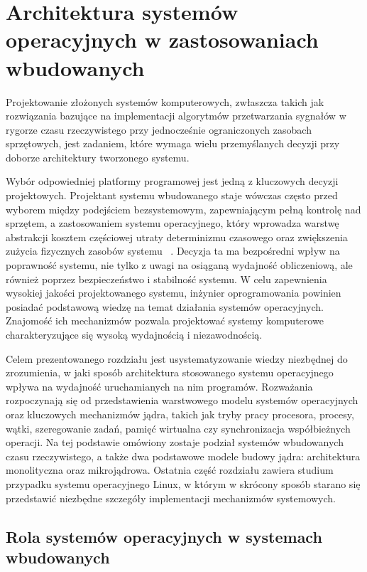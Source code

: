 \chapter{Architektura systemów operacyjnych w zastosowaniach wbudowanych}\label{}
Projektowanie złożonych systemów komputerowych, zwłaszcza takich jak rozwiązania bazujące na implementacji algorytmów przetwarzania sygnałów w rygorze czasu rzeczywistego przy jednocześnie ograniczonych zasobach sprzętowych, jest zadaniem, które wymaga wielu przemyślanych decyzji przy doborze architektury tworzonego systemu.

Wybór odpowiedniej platformy programowej jest jedną z kluczowych decyzji projektowych. Projektant systemu wbudowanego staje wówczas często przed wyborem między podejściem bezsystemowym, zapewniającym pełną kontrolę nad sprzętem, a zastosowaniem systemu operacyjnego, który wprowadza warstwę abstrakcji kosztem częściowej utraty determinizmu czasowego oraz zwiększenia zużycia fizycznych zasobów systemu ~\cite{Tanenbaum}. Decyzja ta ma bezpośredni wpływ na poprawność systemu, nie tylko z uwagi na osiąganą wydajność obliczeniową, ale również poprzez bezpieczeństwo i stabilność systemu.
W celu zapewnienia wysokiej jakości projektowanego systemu, inżynier oprogramowania powinien posiadać podstawową wiedzę na temat działania systemów operacyjnych. Znajomość ich mechanizmów pozwala projektować systemy komputerowe charakteryzujące się wysoką wydajnością i niezawodnością.

Celem prezentowanego rozdziału jest usystematyzowanie wiedzy niezbędnej do zrozumienia, w jaki sposób architektura stosowanego systemu operacyjnego wpływa na wydajność uruchamianych na nim programów. Rozważania rozpoczynają się od przedstawienia warstwowego modelu systemów operacyjnych oraz kluczowych mechanizmów jądra, takich jak tryby pracy procesora, procesy, wątki, szeregowanie zadań, pamięć wirtualna czy synchronizacja współbieżnych operacji. Na tej podstawie omówiony zostaje podział systemów wbudowanych czasu rzeczywistego, a także dwa podstawowe modele budowy jądra: architektura monolityczna oraz mikrojądrowa. Ostatnia część rozdziału zawiera studium przypadku systemu operacyjnego Linux, w którym w skrócony sposób starano się przedstawić niezbędne szczegóły implementacji mechanizmów systemowych.

\section{Rola systemów operacyjnych w systemach wbudowanych}

